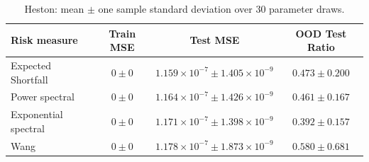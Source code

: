 \begin{table}[ht]
    \centering
    \begin{tabular}{lccc}
        \toprule
        Risk measure & Train MSE & Test MSE & OOD Test Ratio \\
        \midrule
        Expected Shortfall & $0\pm 0$ & $1.159\times 10^{-7}\pm 1.405\times 10^{-9}$ & $0.473\pm 0.200$ \\
        Power spectral & $0\pm 0$ & $1.164\times 10^{-7}\pm 1.426\times 10^{-9}$ & $0.461\pm 0.167$ \\
        Exponential spectral & $0\pm 0$ & $1.171\times 10^{-7}\pm 1.398\times 10^{-9}$ & $0.392\pm 0.157$ \\
        Wang & $0\pm 0$ & $1.178\times 10^{-7}\pm 1.873\times 10^{-9}$ & $0.580\pm 0.681$ \\
        \bottomrule
    \end{tabular}
    \caption{Heston: mean $\pm$ one sample standard deviation over 30 parameter draws.}
    \label{tab:risk-heston}
\end{table}
